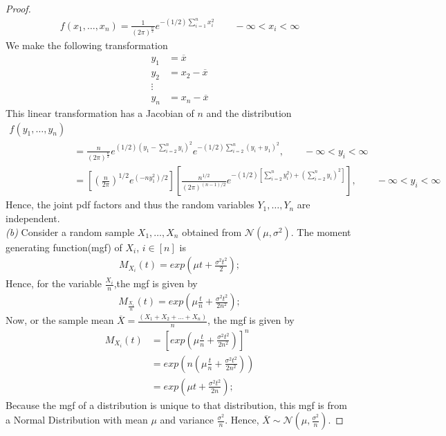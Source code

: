 \documentclass[a4paper,english,12pt]{article}
\begin{document}
\begin{proof}
\begin{align}
f(x_1,\dots,x_n)=\frac{1}{{(2\pi)}^{\frac{n}{2}}}e^{-(1/2)\sum_{i=1}^n x_i^2}  \qquad - \infty <x_i< \infty
\end{align}
We make the following transformation 
\begin{align}
y_1&=\overline{x}  \nonumber \\
y_2&=x_2-\overline{x} \nonumber \\
\vdots \nonumber \\
y_n&=x_n-\overline{x}
\end{align}
This linear transformation has a Jacobian of $n$ and the distribution 
\begin{align}
f(y_1,\dots ,y_n)& \nonumber \\
&= \frac{n}{{(2\pi)}^{\frac{n}{2}}}e^{(1/2)(y_1-\sum_{i=2}^ny_i)^2}e^{-(1/2)\sum_{i=2}^n(y_i+y_1)^2}, \qquad - \infty < y_i <\infty \nonumber \\
&= \left[ {\left( \frac{n}{2\pi}\right)}^{1/2}e^{(-ny_1^2)/2}\right] \left[ \frac{n^{1/2}}{(2\pi)^{(n-1)/2}}e^{-(1/2){[\sum_{i=2}^ny_i^2)+{(\sum_{i=2}^ny_i)}^2]}}\right], \qquad - \infty < y_i <\infty
\end{align}
Hence, the joint pdf factors and thus the random variables $Y_1,\dots ,Y_n$ are independent. 
\\
\textit{(b)} 
Consider a random sample $X_1,\dots ,X_n$ obtained from $\mathcal{N}(\mu,\sigma^2)$. The moment generating function(mgf) of $X_i$, $i\in[n]$ is 
\begin{align}
M_{X_i}(t)=exp{(\mu t +\frac{\sigma^2 t^2}{2})};
\end{align}
Hence, for the variable $\frac{X_i}{n}$,the mgf is given by 
\begin{align}
M_{\frac{X_i}{n}}(t)=exp{(\mu \frac{t}{n} +\frac{\sigma^2 t^2}{2n^2})};
\end{align}
Now, or the sample mean $\overline{X}=\frac{(X_1+X_2+\dots +X_n)}{n}$, the mgf is given by 
\begin{align}
M_{X_i}(t)&={\left[exp{(\mu \frac{t}{n} +\frac{\sigma^2 t^2}{2n^2})}\right]}^n \nonumber \\
&=exp{(n(\mu \frac{t}{n} +\frac{\sigma^2 t^2}{2n^2}))} \nonumber \\
&=exp{(\mu t +\frac{\sigma^2 t^2}{2n})};
\end{align}
Because the mgf of a distribution is unique to that distribution, this mgf is from a Normal Distribution with mean $\mu$ and variance $\frac{\sigma^2}{n}$. Hence, $\overline{X} \sim \mathcal{N}(\mu,\frac{\sigma^2}{n}).$

\end{proof}
\end{document}
